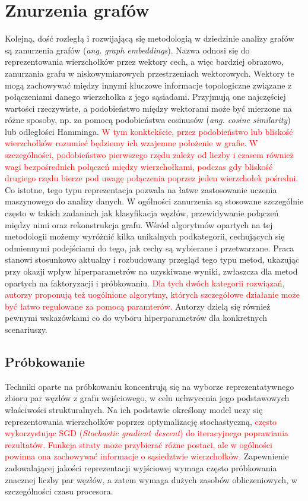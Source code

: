 \section{Znurzenia grafów}
    Kolejną, dość rozległą i rozwijającą się metodologią w dziedzinie analizy grafów są zanurzenia grafów (\emph{ang. graph embeddings}). Nazwa odnosi się do reprezentowania wierzchołków przez wektory cech, a więc bardziej obrazowo, zanurzania grafu w niskowymiarowych przestrzeniach wektorowych. Wektory te mogą zachowywać między innymi kluczowe informacje topologiczne związane z połączeniami danego wierzchołka z jego sąsiadami. Przyjmują one najczęściej wartości rzeczywiste, a podobieństwo między wektorami może być mierzone na różne sposoby, np.  za pomocą podobieństwa cosinusów (\emph{ang. cosine similarity}) lub odległości Hamminga\cite{Lian_Zheng_Zheng_Ge_Cao_Tsang_Xie_2018}. \textcolor{red}{W tym konktekście, przez podobieństwo lub bliskość wierzchołków rozumieć będziemy ich wzajemne położenie w grafie. W szczególności, podobieństwo pierwszego rzędu zależy od liczby i czasem również wagi bezpośrednich połączeń między wierzchołkami, podczas gdy bliskość drugiego rzędu bierze pod uwagę połączenia poprzez jeden wierzchołek pośredni.} Co istotne, tego typu reprezentacja pozwala na łatwe zastosowanie uczenia maszynowego do analizy danych. W ogólności zanurzenia są stosowane szczególnie często w takich zadaniach jak klasyfikacja węzłów, przewidywanie połączeń między nimi oraz rekonstrukcja grafu. Wśród algorytmów opartych na tej metodologii możemy wyróżnić kilka unikalnych podkategorii, cechujących się odmiennymi podejściami do tego, jak cechy są wybierane i przetwarzane. Praca \cite{Yang_Qu_Hussein_Rosso_Cudré-Mauroux_Liu_2023} stanowi stosunkowo aktualny i rozbudowany przegląd tego typu metod, ukazując przy okazji wpływ hiperparametrów na uzyskiwane wyniki, zwłaszcza dla metod opartych na faktoryzacji i próbkowaniu. \textcolor{red}{Dla tych dwóch kategorii rozwiązań, autorzy proponują też uogólnione algorytmy, których szczegółowe działanie może być łatwo regulowane za pomocą paramterów.} Autorzy dzielą się również pewnymi wskazówkami co do wyboru hiperparametrów dla konkretnych scenariuszy. 

    \subsection{Próbkowanie}
        Techniki oparte na próbkowaniu koncentrują się na wyborze reprezentatywnego zbioru par węzłów z grafu wejściowego, w celu uchwycenia jego podstawowych właściwości strukturalnych. Na ich podstawie określony model uczy się reprezentowania wierzchołków poprzez optymalizację stochastyczną, \textcolor{red}{często wykorzystując SGD (\emph{Stochastic gradient descent}) do iteracyjnego poprawiania rezultatów. Funkcja straty może przybierać różne postaci, ale w ogólności powinna ona zachowywać informacje o sąsiedztwie wierzchołków}. Zapewnienie zadowalającej jakości reprezentacji wyjściowej wymaga często próbkowania znacznej liczby par węzłów, a zatem wymaga dużych zasobów obliczeniowych, w szczególności czasu procesora.
            
